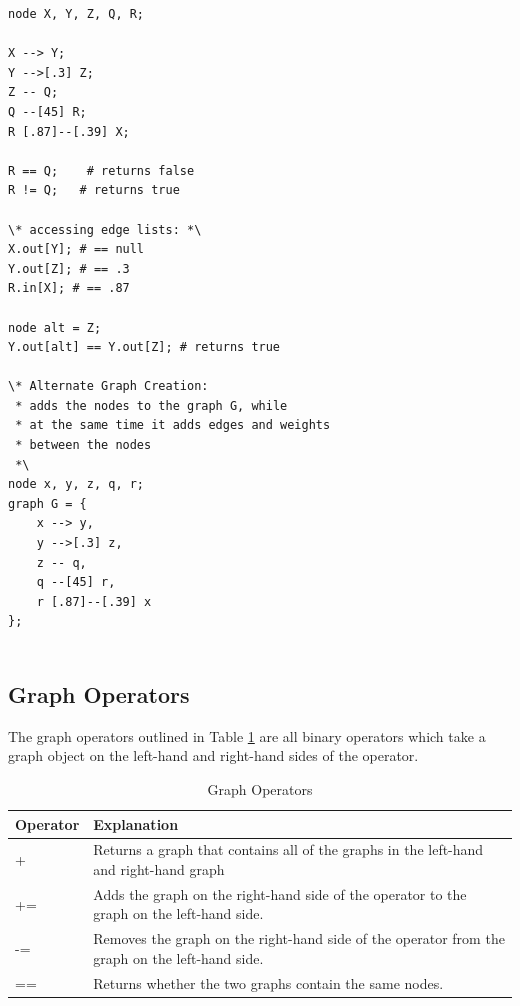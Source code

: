 \documentclass{article}
\begin{document}
\begin{lstlisting}[language=pltLang, caption=Shows the use of node operators that creates the graph in Figure \ref{fig:node_ops}., label=lst:node-ops]
node X, Y, Z, Q, R;

X --> Y;
Y -->[.3] Z;
Z -- Q;
Q --[45] R;
R [.87]--[.39] X;

R == Q;    # returns false
R != Q;   # returns true

\* accessing edge lists: *\
X.out[Y]; # == null
Y.out[Z]; # == .3
R.in[X]; # == .87

node alt = Z;
Y.out[alt] == Y.out[Z]; # returns true

\* Alternate Graph Creation:
 * adds the nodes to the graph G, while
 * at the same time it adds edges and weights
 * between the nodes
 *\
node x, y, z, q, r;
graph G = {
    x --> y,
    y -->[.3] z,
    z -- q,
    q --[45] r,
    r [.87]--[.39] x
};
    

\end{lstlisting}

\subsection{Graph Operators}

The graph operators outlined in Table \ref{tbl:graph-ops} are all binary operators which take a graph object on the left-hand and right-hand sides of the operator.

\begin{table}[H]
\centering
\begin{tabular}{| p{1.5in} | p{2.75in} |}
\hline
Operator & Explanation \\
\hline
+ & Returns a graph that contains all of the graphs in the left-hand and right-hand graph \\
\hline
+= & Adds the graph on the right-hand side of the operator to the graph on the left-hand side. \\
\hline
-= & Removes the graph on the right-hand side of the operator from the graph on the left-hand side. \\
\hline
== & Returns whether the two graphs contain the same nodes. \\
\hline
\end{tabular}
\caption{Graph Operators}
\label{tbl:graph-ops}
\end{table}
\end{document}
